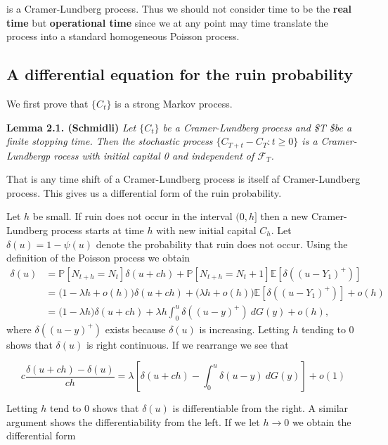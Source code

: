 \documentclass[a4paper,10pt,openany]{book}
\begin{document}
is a Cramer-Lundberg process. Thus we should not consider time to be the \textbf{real time} but \textbf{operational time} since we at any point may time translate the process into a standard homogeneous Poisson process.

\hypertarget{a-differential-equation-for-the-ruin-probability}{%
\subsection{A differential equation for the ruin probability}\label{a-differential-equation-for-the-ruin-probability}}

We first prove that \(\{C_t\}\) is a strong Markov process.

\textbf{Lemma 2.1. (Schmidli)} \emph{Let \(\{C_t\}\) be a Cramer-Lundberg process and \$T \$be a finite stopping time. Then the stochastic process \(\{C_{T+t}−C_T : t\ge 0\}\) is a Cramer-Lundbergp rocess with initial capital 0 and independent of \(\mathcal F_T\).}

That is any time shift of a Cramer-Lundberg process is itself af Cramer-Lundberg process. This gives us a differential form of the ruin probability.

Let \(h\) be small. If ruin does not occur in the interval \((0,h]\) then a new Cramer-Lundberg process starts at time \(h\) with new initial capital \(C_h\). Let \(\delta(u) = 1 − \psi(u)\) denote the probability that ruin does not occur. Using the definition of the Poisson process we obtain
\begin{align*}
\delta (u)&=\mathbb P[N_{t+h}=N_t]\delta(u+ch)+\mathbb P[N_{t+h}=N_t+1]\mathbb E[\delta((u-Y_1)^+)]\\
&=\Big(1-\lambda h+o(h)\Big)\delta(u+ch)+\Big(\lambda h + o(h)\Big)\mathbb E[\delta((u-Y_1)^+)]+o(h)\\
&=\Big(1-\lambda h\Big)\delta(u+ch)+\lambda h\int_0^u\delta((u-y)^+)\ dG(y)+o(h),
\end{align*}
where \(\delta((u-y)^+)\) exists because \(\delta(u)\) is increasing. Letting \(h\) tending to 0 shows that \(\delta(u)\) is right continuous. If we rearrange we see that

\[
c\frac{\delta(u+ch)-\delta(u)}{ch}=\lambda\left[\delta(u+ch)-\int_0^u\delta(u-y)\ dG(y)\right]+o(1)
\]

Letting \(h\) tend to 0 shows that \(\delta(u)\) is differentiable from the right. A similar argument shows the differentiability from the left. If we let \(h\to 0\) we obtain the differential form
\end{document}
